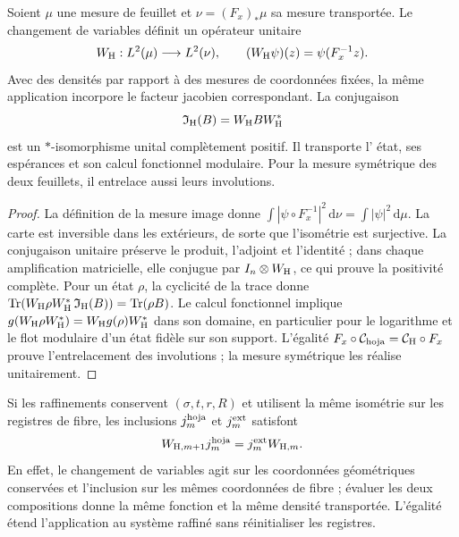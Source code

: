 \begin{proposition}
\label{vii:vii:prop:transporte-unitario-horizonte}
Soient \(\mu\) une mesure de feuillet et \(\nu=(F_x)_*\mu\) sa mesure
transportée. Le changement de variables définit un opérateur unitaire
\begin{equation}
 W_{\rm H}:L^2(\mu)\longrightarrow L^2(\nu),\qquad
 (W_{\rm H}\psi)(z)=\psi(F_x^{-1}z).
 \label{vii:vii:eq:unitaria-horizonte}
\end{equation}
Avec des densités par rapport à des mesures de coordonnées fixées, la même application incorpore le facteur jacobien correspondant. La conjugaison
\begin{equation}
 \mathfrak I_{\rm H}(B)=W_{\rm H}BW_{\rm H}^*
 \label{vii:vii:eq:mapa-observables-horizonte}
\end{equation}
est un \(*\)-isomorphisme unital complètement positif. Il transporte l'
état, ses espérances et son calcul fonctionnel modulaire. Pour la mesure
symétrique des deux feuillets, il entrelace aussi leurs involutions.
\end{proposition}
\begin{proof}
La définition de la mesure image donne \(\int|\psi\circ F_x^{-1}|^2\,\mathrm d\nu
=\int|\psi|^2\,\mathrm d\mu\). La carte est inversible dans les extérieurs, de sorte que l'isométrie est surjective. La conjugaison unitaire préserve le produit, l'adjoint et l'identité ; dans chaque amplification matricielle, elle conjugue par \(I_n\otimes W_{\rm H}\), ce qui prouve la positivité complète. Pour un état \(\rho\), la cyclicité de la trace donne \(\operatorname{Tr}(W_{\rm H}\rho W_{\rm H}^*
\,\mathfrak I_{\rm H}(B))=\operatorname{Tr}(\rho B)\). Le calcul fonctionnel implique \(g(W_{\rm H}\rho W_{\rm H}^*)=W_{\rm H}g(\rho)W_{\rm H}^*\) dans son domaine, en particulier pour le logarithme et le flot modulaire d'un état fidèle sur son support. L'égalité \(F_x\circ\mathcal C_{\rm hoja}=\mathcal C_{\rm H}\circ F_x\) prouve l'entrelacement des involutions ; la mesure symétrique les réalise unitairement.
\end{proof}

Si les raffinements conservent \((\sigma,t,r,R)\) et utilisent la même
isométrie sur les registres de fibre, les inclusions
\(j_m^{\rm hoja}\) et \(j_m^{\rm ext}\) satisfont
\begin{equation}
 W_{{\rm H},m+1}j_m^{\rm hoja}
 =j_m^{\rm ext}W_{{\rm H},m}.
 \label{vii:vii:eq:naturalidad-horizonte}
\end{equation}
En effet, le changement de variables agit sur les coordonnées géométriques
conservées et l'inclusion sur les mêmes coordonnées de fibre ; évaluer
les deux compositions donne la même fonction et la même densité transportée.
L'égalité étend l'application au système raffiné sans réinitialiser les registres.

